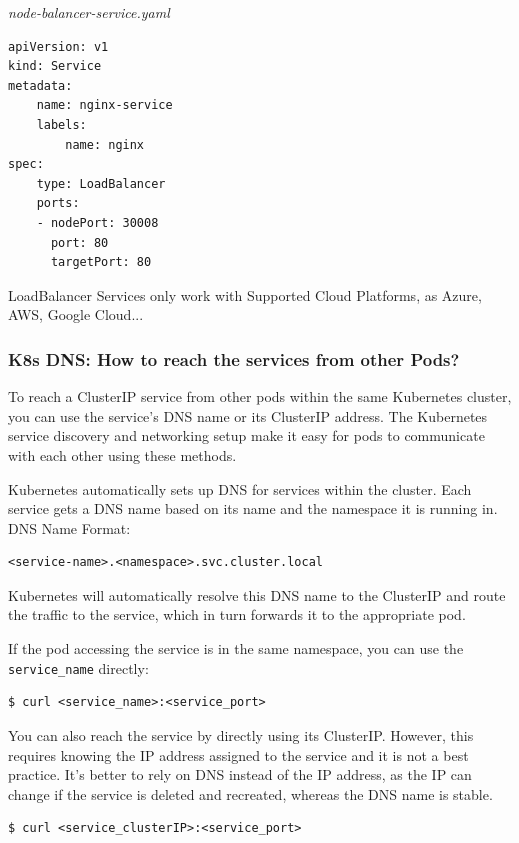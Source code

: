 \documentclass{article}
\newenvironment{blocktemplateII}[1]{%
    \tcolorbox[beamer,%
    noparskip,breakable,
    colframe=Green,%
    colbacklower=LimeGreen!75!LightGreen,%
    title=#1]}%
    {\endtcolorbox}
\newenvironment{blocktemplateIII}[1]{%
    \tcolorbox[beamer,%
    noparskip,breakable,
    ,colframe=Red,%
    colbacklower=LimeGreen!75!LightGreen,%
    title=#1]}%
    {\endtcolorbox}
\newenvironment{codetemplate}[1][]{%
  \mybasecolorbox[#1]
  \itshape
}{%
  \endmybasecolorbox
}
\begin{document}
\begin{codetemplate}{node-balancer-service.yaml}
\begin{verbatim}
apiVersion: v1
kind: Service
metadata:
    name: nginx-service
    labels:
        name: nginx
spec:
    type: LoadBalancer
    ports:
    - nodePort: 30008
      port: 80
      targetPort: 80
\end{verbatim}
\end{codetemplate}

\begin{blocktemplateIII}{WARNING}
LoadBalancer Services only work with Supported Cloud Platforms, as Azure, AWS, Google Cloud...    
\end{blocktemplateIII}

\subsubsection{K8s DNS: How to reach the services from other Pods?}
To reach a ClusterIP service from other pods within the same Kubernetes cluster, you can use the service's DNS name or its ClusterIP address. The Kubernetes service discovery and networking setup make it easy for pods to communicate with each other using these methods.

Kubernetes automatically sets up DNS for services within the cluster. Each service gets a DNS name based on its name and the namespace it is running in. DNS Name Format: 
\begin{codetemplate}{}
\begin{verbatim}
<service-name>.<namespace>.svc.cluster.local
\end{verbatim}
\end{codetemplate}

Kubernetes will automatically resolve this DNS name to the ClusterIP and route the traffic to the service, which in turn forwards it to the appropriate pod.

\begin{blocktemplateII}{NOTE}
If the pod accessing the service is in the same namespace, you can use the \verb|service_name| directly:
\begin{codetemplate}{}
\begin{verbatim}
$ curl <service_name>:<service_port>
\end{verbatim}
\end{codetemplate}
\end{blocktemplateII}

You can also reach the service by directly using its ClusterIP. However, this requires knowing the IP address assigned to the service and it is not a best practice. It's better to rely on DNS instead of the IP address, as the IP can change if the service is deleted and recreated, whereas the DNS name is stable.
\begin{codetemplate}{}
\begin{verbatim}
$ curl <service_clusterIP>:<service_port>
\end{verbatim}
\end{codetemplate}
\end{document}
